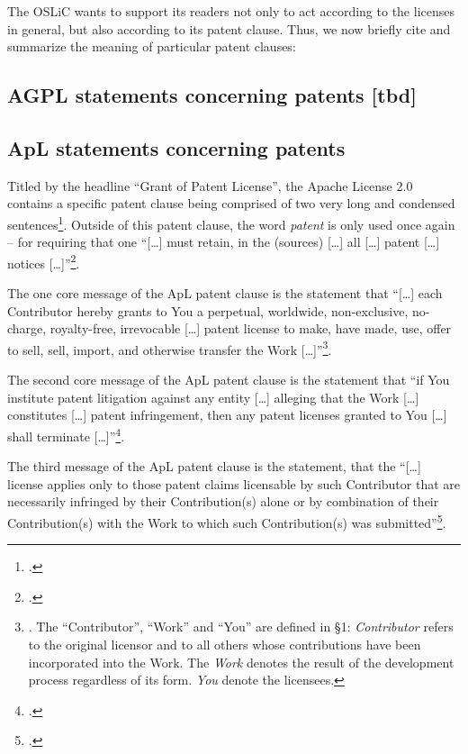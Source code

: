 The OSLiC wants to support its readers not only to act according to the licenses
in general, but also according to its patent clause. Thus, we now briefly cite
and summarize the meaning of particular patent clauses:

\subsection{AGPL statements concerning patents [tbd]}\label{subsec:Agpl30PatentClause}

\subsection{ApL statements concerning patents}\label{subsec:ApLPatentClause}

Titled by the headline \enquote{Grant of Patent License}, the Apache License 2.0
contains a specific patent clause being comprised of two very long and condensed
sentences\footcite[cf.][\nopage wp §3]{Apl20OsiLicense2004a}. Outside of this
patent clause, the word \emph{patent} is only used once again -- for requiring
that one \enquote{[\ldots] must retain, in the (sources) [\ldots] all [\ldots]
patent [\ldots] notices [\ldots]}\footcite[cf.][\nopage wp
§4.3]{Apl20OsiLicense2004a}.

The one core message of the ApL patent clause is the statement that
\enquote{[\ldots] each Contributor hereby grants to You a perpetual, worldwide,
non-exclusive, no-charge, royalty-free, irrevocable [\ldots] patent license to
make, have made, use, offer to sell, sell, import, and otherwise transfer the
Work [\ldots]}\footnote{\cite[cf.][\nopage wp §3]{Apl20OsiLicense2004a}. The \enquote{Contributor},
\enquote{Work} and \enquote{You} are defined in §1: \emph{Contributor} refers to
the original licensor and to all others whose contributions have been
incorporated into the Work. The \emph{Work} denotes the result of the
development process regardless of its form. \emph{You} denote the
licensees.}.

The second core message of the ApL patent clause is the statement that
\enquote{if You institute patent litigation against any entity [\ldots] alleging
that the Work [\ldots] constitutes [\ldots] patent infringement, then any patent
licenses granted to You [\ldots] shall terminate [\ldots]}\footcite[cf.][\nopage
wp §3]{Apl20OsiLicense2004a}.

The third message of the ApL patent clause is the statement, that the
\enquote{[\ldots] license applies only to those patent claims licensable by such
Contributor that are necessarily infringed by their Contribution(s) alone or by
combination of their Contribution(s) with the Work to which such Contribution(s)
was submitted}\footcite[cf.][\nopage wp §3]{Apl20OsiLicense2004a}.


